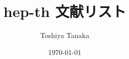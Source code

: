 \documentclass[dvipdfmx, a4paper]{jsarticle}
\title{hep-th 文献リスト}
\author{Toshiya Tanaka}
\date{\today}
\theoremstyle{break}
\begin{document}
	\maketitle

	\nocite{*}
	
	
\end{document}
